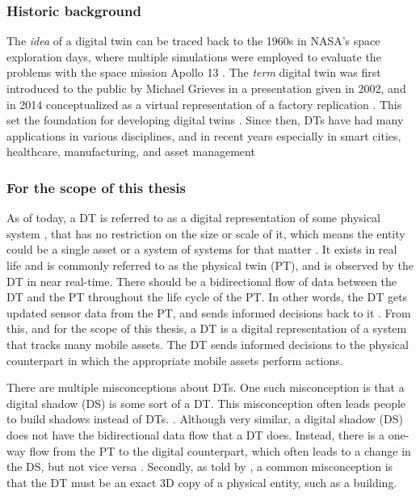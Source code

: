 \documentclass{article}
\begin{document}
\subsubsection{Historic background}
The \emph{idea} of a digital twin can be traced back to the 1960s in NASA's space exploration days, where multiple simulations were employed to evaluate the problems with the space mission Apollo 13 \cite{noauthor_digital_nodate, fuller_digital_2020}. The \emph{term} digital twin was first introduced to the public by Michael Grieves in a presentation given in 2002, and in 2014 conceptualized as a virtual representation of a factory replication \cite{grieves_michael_digital_2014}. This set the foundation for developing digital twins \cite{grieves_michael_digital_2014, fuller_digital_2020}. Since then, DTs have had many applications in various disciplines, and in recent years especially in smart cities, healthcare, manufacturing, and asset management \cite{fuller_digital_2020, waszak_let_2022, macchi_exploring_2018}

\subsubsection{For the scope of this thesis}
As of today, a DT is referred to as a digital representation of some physical system \cite{grieves_digital_2017}, that has no restriction on the size or scale of it, which means the entity could be a single asset or a system of systems for that matter \cite{li_digital_2022, waszak_let_2022}. It exists in real life and is commonly referred to as the physical twin (PT), and is observed by the DT in near real-time. There should be a bidirectional flow of data between the DT and the PT throughout the life cycle of the PT. In other words, the DT gets updated sensor data from the PT, and sends informed decisions back to it \cite{madni_leveraging_2019, waszak_let_2022, kamburjan_digital_2022}. From this, and for the scope of this thesis, a DT is a digital representation of a system that tracks many mobile assets. The DT sends informed decisions to the physical counterpart in which the appropriate mobile assets perform actions.

There are multiple misconceptions about DTs. One such misconception is that a digital shadow (DS) is some sort of a DT. This misconception often leads people to build shadows instead of DTs. \cite{fuller_digital_2020, li_digital_2022}.  Although very similar, a digital shadow (DS) does not have the bidirectional data flow that a DT does. Instead, there is a one-way flow from the PT to the digital counterpart, which often leads to a change in the DS, but not vice versa \cite{kritzinger_digital_2018, li_digital_2022}. Secondly, as told by \citeauthor{fuller_digital_2020}, a common misconception is that the DT must be an exact 3D copy of a physical entity, such as a building.
\end{document}
